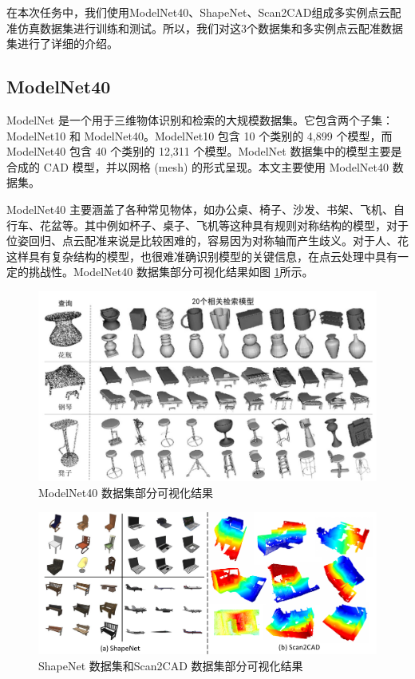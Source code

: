 在本次任务中，我们使用ModelNet40、ShapeNet、Scan2CAD组成多实例点云配准仿真数据集进行训练和测试。所以，我们对这3个数据集和多实例点云配准数据集进行了详细的介绍。

\subsection{ModelNet40}
ModelNet 是一个用于三维物体识别和检索的大规模数据集。它包含两个子集：ModelNet10 和 ModelNet40。ModelNet10 包含 10 个类别的 4,899 个模型，而 ModelNet40 包含 40 个类别的 12,311 个模型。ModelNet 数据集中的模型主要是合成的 CAD 模型，并以网格 (mesh) 的形式呈现。本文主要使用 ModelNet40 数据集。 

ModelNet40 主要涵盖了各种常见物体，如办公桌、椅子、沙发、书架、飞机、自行车、花盆等。其中例如杯子、桌子、飞机等这种具有规则对称结构的模型，对于位姿回归、点云配准来说是比较困难的，容易因为对称轴而产生歧义。对于人、花这样具有复杂结构的模型，也很难准确识别模型的关键信息，在点云处理中具有一定的挑战性。ModelNet40 数据集部分可视化结果如图 \ref{fig:modelnet}所示。

\begin{figure}
    \centering
    \includegraphics[width=\textwidth]{images/ModelNet.pdf}
    \caption{ModelNet40 数据集部分可视化结果}
    \label{fig:modelnet}
    \vspace{-0.5cm}
\end{figure}

\begin{figure}
    \centering
    \includegraphics[width=\textwidth]{images/Shapenet-Scan2CAD.pdf}
    \caption{ShapeNet 数据集和Scan2CAD 数据集部分可视化结果}
    \label{fig:ShapeNet&Scan2CAD}
    \vspace{-0.5cm}
\end{figure}
